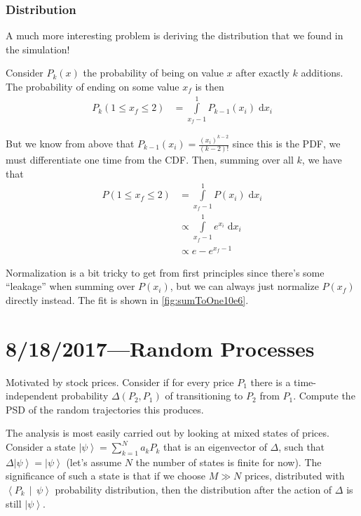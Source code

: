 \documentclass[12pt]{report}
\newcommand{\ket}[1]{\left|#1\right>}
\newcommand{\dotp}[2]{\left<#1\,\middle|\,#2\right>}
\begin{document}
\subsection{Distribution}

A much more interesting problem is deriving the distribution that we found in
the simulation!

Consider $P_k(x)$ the probability of being on value $x$ after exactly $k$
additions. The probability of ending on some value $x_f$ is then
\begin{align}
    P_k(1 \leq x_f \leq 2) &= \int\limits_{x_f - 1}^{1}P_{k - 1}(x_i)\;\mathrm{d}x_i
\end{align}

But we know from above that $P_{k - 1}(x_i) = \frac{(x_i)^{k - 2}}{(k - 2)!}$
since this is the PDF, we must differentiate one time from the CDF\@. Then,
summing over all $k$, we have that
\begin{align}
    P(1 \leq x_f \leq 2) &= \int\limits_{x_f - 1}^{1}P(x_i)\;\mathrm{d}x_i\\
        &\propto \int\limits_{x_f - 1}^{1}e^{x_i}\;\mathrm{d}x_i\\
        &\propto e - e^{x_f - 1}
\end{align}

Normalization is a bit tricky to get from first principles since there's some
``leakage'' when summing over $P(x_i)$, but we can always just normalize
$P(x_f)$ directly instead. The fit is shown in \autoref{fig:sumToOne10e6}.

\chapter{8/18/2017---Random Processes}

Motivated by stock prices. Consider if for every price $P_1$ there is a
time-independent probability $\Delta(P_2, P_1)$ of transitioning to $P_2$
from $P_1$. Compute the PSD of the random trajectories this produces.

The analysis is most easily carried out by looking at mixed states of prices.
Consider a state $\ket{\psi} = \sum\limits_{k=1}^{N} a_kP_k$ that is an
eigenvector of $\Delta$, such that $\Delta\ket{\psi} = \ket{\psi}$
(let's assume $N$ the number of states is finite for now). The significance of
such a state is that if we choose $M \gg N$ prices, distributed with
$\dotp{P_k}{\psi}$ probability distribution, then the distribution after the
action of $\Delta$ is still $\ket{\psi}$.
\end{document}
